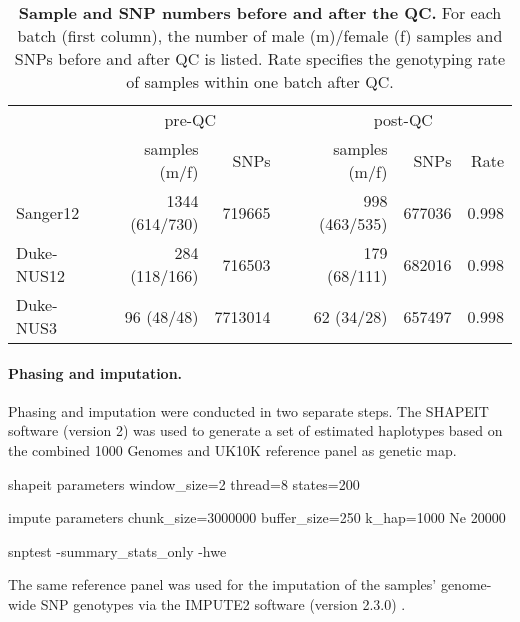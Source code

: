 \begin{table}[htbp]
  \centering
  \caption[\textbf{Sample and SNP numbers before and after the QC. }]{\textbf{Sample and SNP numbers before and after the QC. } For each batch (first column), the number of male (m)/female (f) samples and SNPs before and after QC is listed. Rate specifies the genotyping rate of samples within one batch after QC. }
    \begin{tabular}{lrrrrrr}
    \toprule
          & \multicolumn{2}{c}{pre-QC} &       & \multicolumn{3}{c}{post-QC} \\
\cmidrule{2-3}\cmidrule{5-7}          & samples (m/f) & SNPs  &       & samples (m/f) & SNPs  & Rate \\
\cmidrule{2-7}    Sanger12 & \num{1344}  (\num{614}/\num{730}) & \num{719665} &       & \num{998} (\num{463}/\num{535}) & \num{677036} & \num{0.998} \\
    Duke-NUS12 & \num{284} (\num{118}/\num{166}) & \num{716503} &       & \num{179} (\num{68}/\num{111}) & \num{682016} & \num{0.998} \\
    Duke-NUS3 & \num{96} (\num{48}/\num{48}) & \num{7713014} &       & \num{62} (\num{34}/\num{28}) & \num{657497} & \num{0.998} \\
    \bottomrule
    \end{tabular}%
    \label{tab:genoOverview}%
\end{table}%

\paragraph{Phasing and imputation.} Phasing and imputation were conducted in two separate steps. The SHAPEIT software (version 2) \citep{Delaneau2012,Delaneau2013} was used to generate a set of estimated haplotypes based on the combined \num{1000} Genomes \citep{Abecasis2012} and UK10K \citep{UK10KConsortium2014} reference panel as genetic map. 

shapeit parameters
window_size=2
thread=8
states=200

impute parameters
chunk_size=3000000
buffer_size=250
k_hap=1000
Ne 20000

snptest -summary_stats_only -hwe

The same reference panel was used for the imputation of the samples’ genome-wide SNP genotypes via the IMPUTE2 software (version 2.3.0) \citep{Marchini2007, Howie2009}. 

